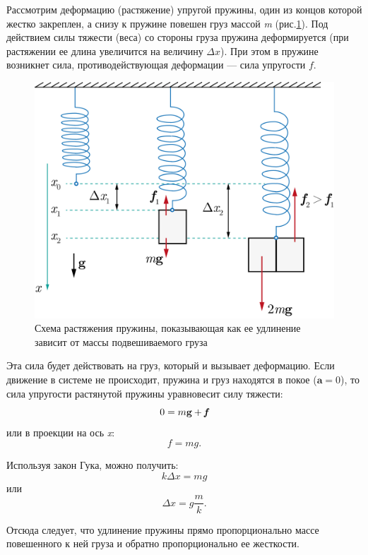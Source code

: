 \documentclass[14pt,a4paper,oneside]{extarticle}	%
\begin{document}
Рассмотрим деформацию (растяжение) упругой пружины, один из концов которой жестко закреплен, а снизу к пружине повешен груз массой \textit{m} (рис.\ref{Hooke-3}).
Под действием силы тяжести (веса) со стороны груза пружина деформируется (при растяжении ее длина увеличится на величину $ \Delta x $).
При этом в пружине возникнет сила, противодействующая деформации — сила упругости $ f $.

\begin{figure}[H] 
	\centering 	
	\includegraphics[width=0.6\linewidth]{Hooke-3.png}
	\caption{Схема растяжения пружины, показывающая как ее удлинение зависит от массы подвешиваемого груза}
	\label{Hooke-3}
\end{figure}

Эта сила будет действовать на груз, который и вызывает деформацию.
Если движение в системе не происходит, пружина и груз находятся в покое ($ \textbf{a}=0 $), то сила упругости растянутой пружины уравновесит силу тяжести:
\begin{equation}\label{Hooke-1eq2}
0=m\textbf{g}+ \textit{\textbf{f}}
\end{equation}
или в проекции на ось \textit{x}:
\begin{equation}
f=mg.
\end{equation}

Используя закон Гука, можно получить:
\begin{equation}\label{Hooke-1eq3}
k\Delta x=mg
\end{equation}
или
\begin{equation}\label{Hooke-1eq4}
\Delta x = g\frac mk.
\end{equation}

Отсюда следует, что удлинение пружины прямо пропорционально массе повешенного к ней груза и обратно пропорционально ее жесткости.
\end{document}
